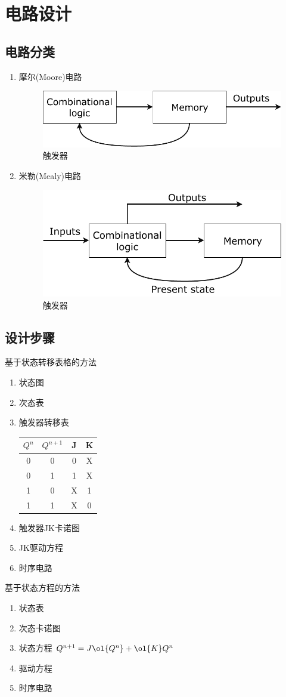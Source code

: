\section{电路设计}
\subsection{电路分类}
\begin{enumerate}
\item 摩尔(Moore)电路
\begin{figure}[htbp]
	\centering
	\includegraphics[width=0.4\linewidth]{fig/moore_machine.pdf}
	\caption{触发器}
\end{figure}
\item 米勒(Mealy)电路
\begin{figure}[htbp]
	\centering
	\includegraphics[width=0.4\linewidth]{fig/mealy_machine.pdf}
	\caption{触发器}
\end{figure}
\end{enumerate}
\subsection{设计步骤}
\par 基于状态转移表格的方法
\begin{enumerate}
    \item 状态图
    \item 次态表
    \item 触发器转移表
\begin{center}
\begin{tabular}{|c|c|c|c|}
\hline
$Q^n$ & $Q^{n+1}$ & J & K\\\hline
0 & 0 & 0 & X\\\hline
0 & 1 & 1 & X\\\hline
1 & 0 & X & 1\\\hline
1 & 1 & X & 0\\\hline
\end{tabular}
\end{center}
    \item 触发器JK卡诺图
    \item JK驱动方程
    \item 时序电路
\end{enumerate}
\par 基于状态方程的方法
\begin{enumerate}
	\item 状态表
	\item 次态卡诺图
	\item 状态方程 $Q^{n+1}=J\ol{Q^n}+\ol{K}Q^n$
	\item 驱动方程
	\item 时序电路
\end{enumerate}
